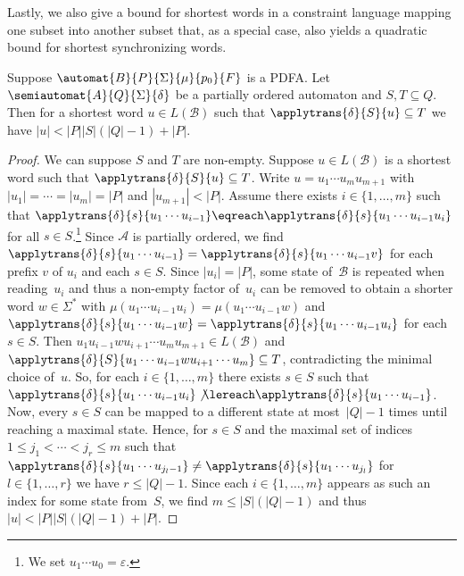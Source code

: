 Lastly, we also give a bound for shortest words in a constraint language mapping
one subset into another subset that, as a special case, also yields a quadratic bound
for shortest synchronizing words.

\begin{proposition}
	\label{compl:prop:ST-pto-bound}	
	Suppose $\automat{B}{P}{\Sigma}{\mu}{p_0}{F}$ is a PDFA.
	Let $\semiautomat{A}{Q}{\Sigma}{\delta}$ be a partially ordered automaton 
	and $S, T \subseteq Q$. 
	Then for a shortest word $u \in L(\mathcal B)$
	such that $\applytrans{\delta}{S}{u} \subseteq T$
	we have $|u| < |P||S|(|Q|-1) + |P|$.	
\end{proposition}
\begin{proof}
	We can suppose $S$ and $T$ are non-empty. 
	Suppose $u \in L(\mathcal B)$
	is a shortest word such that $\applytrans{\delta}{S}{u} \subseteq T$.
	Write $u = u_1 \cdots u_m u_{m+1}$ with $|u_1| = \cdots = |u_{m}| = |P|$
	and $|u_{m+1}| < |P|$.
	Assume there exists $i \in \{1,\ldots,m\}$
	such that
	$\applytrans{\delta}{s}{u_1 \cdots u_{i-1}} \eqreach \applytrans{\delta}{s}{u_1 \cdots u_{i-1} u_{i}}$
	for all $s \in S$.\footnote{We set $u_1 \cdots u_0 = \varepsilon$.}
	Since $\mathcal A$ is partially ordered,
	we find $\applytrans{\delta}{s}{u_1 \cdots u_{i-1}} = \applytrans{\delta}{s}{u_1 \cdots u_{i-1} v}$
	for each prefix $v$ of $u_i$ and each $s \in S$.
	Since $|u_i| = |P|$,
	some state of~$\mathcal B$ is repeated when reading~$u_i$
	and thus a non-empty factor of~$u_i$ can be removed
	to obtain a shorter word $w \in \Sigma^*$
	with $\mu(u_1 \cdots u_{i-1} u_i) = \mu(u_1 \cdots u_{i-1} w)$
	and $\applytrans{\delta}{s}{u_1 \cdots u_{i-1}w} = \applytrans{\delta}{s}{u_1 \cdots u_{i-1} u_i}$
	for each $s \in S$.
	Then $u_1 u_{i-1} w u_{i+1} \cdots u_m u_{m+1} \in L(\mathcal B)$
	and $\applytrans{\delta}{S}{u_1 \cdots u_{i-1} w u_{i+1} \cdots u_m} \subseteq T$,
	contradicting the minimal choice of~$u$.
	So, for each $i \in \{1,\ldots,m\}$ there exists $s \in S$
	such that $\applytrans{\delta}{s}{u_1\cdots u_{i-1} u_{i}} \not\lereach \applytrans{\delta}{s}{u_1\cdots u_{i-1}}$.
	Now, every $s \in S$
	can be mapped to a different state at most~$|Q| - 1$ times until reaching a maximal state.
	Hence, for $s \in S$ 
	and the maximal set of indices $1 \le j_1 < \cdots < j_r \le m$
	such that $\applytrans{\delta}{s}{u_1 \cdots u_{j_l-1}} \ne \applytrans{\delta}{s}{u_1 \cdots u_{j_l}}$
	for $l\in \{1,\ldots,r\}$
	we have $r \le |Q| - 1$.
	Since each $i \in \{1,\ldots,m\}$
	appears as such an index for some state from~$S$,
	we find $m \le |S|(|Q|-1)$
	and thus $|u| < |P| |S| (|Q| - 1) + |P|$.
\end{proof}


